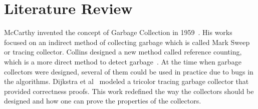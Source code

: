 \section{Literature Review}

McCarthy invented the concept of Garbage Collection in 1959~\cite{mccarthy}. His works focused on an indirect method of collecting 
garbage which is called Mark Sweep or tracing collector. Collins designed a new method called reference counting, which is a more direct method to detect garbage~\cite{Collins1960}. 
At the time when garbage collectors were designed, several of them could be used in practice due to bugs in the algorithms. Dijkstra et al~\cite{dijkstra} modeled a tricolor tracing garbage collector that provided correctness proofs. This work redefined the 
way the collectors should be designed and how one can prove the properties of the collectors. 

